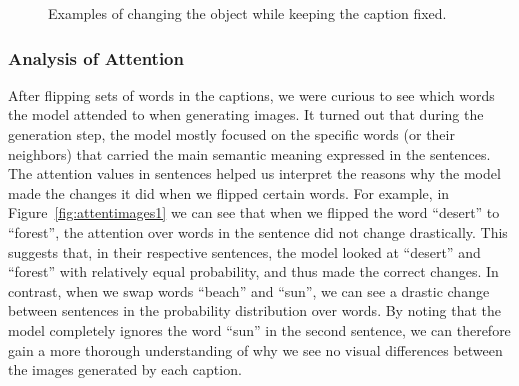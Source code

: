 \documentclass{article} %
\begin{document}
\begin{figure}[!h]
\captionsetup[subfigure]{labelformat=empty}
\begin{center}
\quad
%
\quad
%
\quad
%
\quad
%
\end{center}
\caption{Examples of changing the object while keeping the caption fixed.}
\label{fig:genimages3}
\vspace{-0.3cm}
\end{figure}

\subsubsection{Analysis of Attention}

After flipping sets of words in the captions, we were curious to see which words the model attended to when generating images. It turned out that during the generation step, the model mostly focused on the specific words (or their neighbors) that carried the main semantic meaning expressed in the sentences. The attention values in sentences helped us interpret the reasons why the model made the changes it did when we flipped certain words. For example, in Figure~\ref{fig:attentimages1} we can see that when we flipped the word ``desert'' to ``forest'', the attention over words in the sentence did not change drastically. This suggests that, in their respective sentences, the model looked at ``desert'' and ``forest'' with relatively equal probability, and thus made the correct changes. In contrast, when we swap words ``beach'' and ``sun'', we can see a drastic change between sentences in the probability distribution over words. By noting that the model completely ignores the word ``sun'' in the second sentence, we can therefore gain a more thorough understanding of why we see no visual differences between the images generated by each caption.
\end{document}
